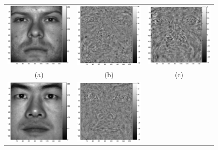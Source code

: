 \documentclass[11pt]{article}
\begin{document}
\begin{figure}[htb]
\centering
\begin{tabular}{ccc}
 \includegraphics[width=5cm]{sub1.eps} &
  \includegraphics[width=5cm]{sub11.eps} &
   \includegraphics[width=5cm]{sub12.eps}\\
   (a)&(b)&(c)\\
 \includegraphics[width=5cm]{sub2.eps} &
  \includegraphics[width=5cm]{sub22.eps} &

\end{tabular}
\end{figure}
\end{document}
